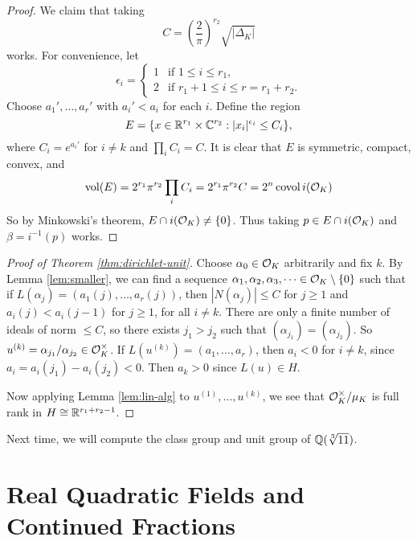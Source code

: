 \begin{proof}
  We claim that taking
  \[
    C = \left(\frac{2}{\pi}\right)^{r_2} \sqrt{|\Delta_K|}
  \]
  works. For convenience, let
  \[
    \epsilon_i =
    \begin{cases}
      1 & \text{if $1 \le i \le r_1$}, \\
      2 & \text{if $r_1 + 1 \le i \le r = r_1 + r_2$}.
    \end{cases}
  \]
  Choose $a_1', \dots, a_r'$ with $a_i' < a_i$
  for each $i$. Define the region
  \[
    E = \{
      x \in \mathbb{R}^{r_1} \times \mathbb{C}^{r_2} : |x_i|^{\epsilon_i} \le C_i
    \},
  \]
  where $C_i = e^{a_i'}$ for $i \ne k$ and $\prod_i C_i = C$.
  It is clear that $E$ is symmetric, compact, convex,
  and
  \[
    \operatorname{vol}(E) = 2^{r_1} \pi^{r_2} \prod_i C_i
    = 2^{r_1} \pi^{r_2} C
    = 2^n \operatorname{covol}{i(\mathcal{O}_K)}
  \]
  So by Minkowski's theorem,
  $E \cap i(\mathcal{O}_K) \ne \{0\}$. Thus taking
  $p \in E \cap i(\mathcal{O}_K)$ and $\beta = i^{-1}(p)$
  works.
\end{proof}

\begin{proof}[Proof of Theorem \ref{thm:dirichlet-unit}]
  Choose $\alpha_0 \in \mathcal{O}_K$ arbitrarily and fix $k$. By
  Lemma \ref{lem:smaller}, we can find a sequence
  $\alpha_1, \alpha_2, \alpha_3, \dots \in \mathcal{O}_K \setminus \{0\}$
  such that if $L(\alpha_j) = (a_1(j), \dots, a_r(j))$,
  then $|N(\alpha_j)| \le C$ for $j \ge 1$
  and $a_i(j) < a_i(j - 1)$ for $j \ge 1$, for
  all $i \ne k$.
  There are only a finite number of ideals of norm
  $\le C$, so there exists $j_1 > j_2$ such that
  $(\alpha_{j_1}) = (\alpha_{j_2})$. So
  $u^{(k)} = \alpha_{j_1} / \alpha_{j_2} \in \mathcal{O}_K^\times$.
  If $L(u^{(k)}) = (a_1, \dots, a_r)$, then
  $a_i < 0$ for $i \ne k$, since
  $a_i = a_i(j_1) - a_i(j_2) < 0$.
  Then $a_k > 0$ since $L(u) \in H$.

  Now applying Lemma \ref{lem:lin-alg} to $u^{(1)}, \dots, u^{(k)}$, we see that
  $\mathcal{O}_K^\times / \mu_K$ is full rank in
  $H \cong \mathbb{R}^{r_1 + r_2 - 1}$.
\end{proof}

\begin{remark}
  Next time, we will compute the class group and
  unit group of $\mathbb{Q}(\sqrt[3]{11})$.
\end{remark}

\section{Real Quadratic Fields and Continued Fractions}

